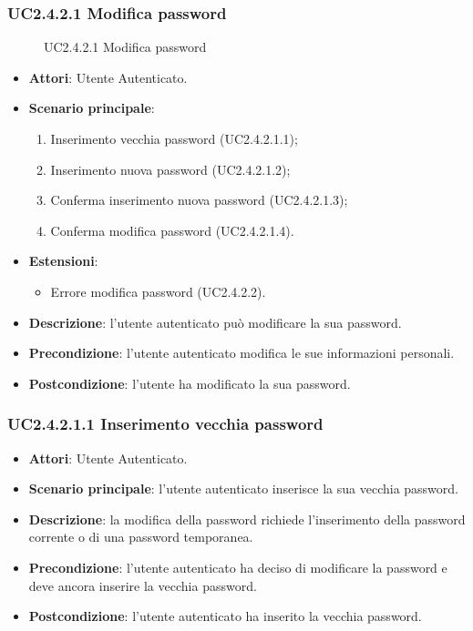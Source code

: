 \subsubsection{UC2.4.2.1 Modifica password}
\begin{figure}[H]
\centering
\noindent{}
\caption{UC2.4.2.1 Modifica password}
\end{figure}
\begin{itemize}
\item \textbf{Attori}: Utente Autenticato.
\item \textbf{Scenario principale}:
\begin{enumerate}
\item Inserimento vecchia password (UC2.4.2.1.1);
\item Inserimento nuova password (UC2.4.2.1.2);
\item Conferma inserimento nuova password (UC2.4.2.1.3);
\item Conferma modifica password (UC2.4.2.1.4).
\end{enumerate}
\item \textbf{Estensioni}:
\begin{itemize}
\item Errore modifica password (UC2.4.2.2).
\end{itemize}
\item \textbf{Descrizione}: l'utente autenticato può modificare la sua password.
\item \textbf{Precondizione}: l'utente autenticato modifica le sue informazioni personali.
\item \textbf{Postcondizione}: l'utente ha modificato la sua password.
\end{itemize}
\subsubsection{UC2.4.2.1.1 Inserimento vecchia password}
\begin{itemize}
\item \textbf{Attori}: Utente Autenticato.
\item \textbf{Scenario principale}: l'utente autenticato inserisce la sua vecchia password.
\item \textbf{Descrizione}: la modifica della password richiede l'inserimento della password corrente o di una password temporanea.
\item \textbf{Precondizione}: l'utente autenticato ha deciso di modificare la password e deve ancora inserire la vecchia password.
\item \textbf{Postcondizione}: l'utente autenticato ha inserito la vecchia password.
\end{itemize}
